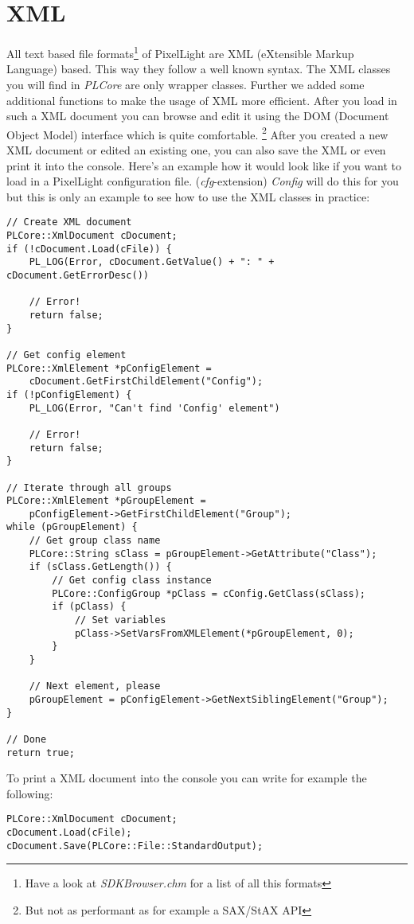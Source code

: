 \section{XML}
All text based file formats\footnote{Have a look at \emph{SDKBrowser.chm} for a list of all this formats} of PixelLight are XML (eXtensible Markup Language) based. This way they follow a well known syntax. The XML classes you will find in \emph{PLCore} are only wrapper classes. Further we added some additional functions to make the usage of XML more efficient. After you load in such a XML document you can browse and edit it using the DOM (Document Object Model) interface which is quite comfortable. \footnote{But not as performant as for example a SAX/StAX API} After you created a new XML document or edited an existing one, you can also save the XML or even print it into the console. Here's an example how it would look like if you want to load in a PixelLight configuration file. (\emph{cfg}-extension) \emph{Config} will do this for you but this is only an example to see how to use the XML classes in practice:

\begin{lstlisting}[caption=XML DOM usage example]
// Create XML document
PLCore::XmlDocument cDocument;
if (!cDocument.Load(cFile)) {
	PL_LOG(Error, cDocument.GetValue() + ": " + cDocument.GetErrorDesc())

	// Error!
	return false;
}

// Get config element
PLCore::XmlElement *pConfigElement =
	cDocument.GetFirstChildElement("Config");
if (!pConfigElement) {
	PL_LOG(Error, "Can't find 'Config' element")

	// Error!
	return false;
}

// Iterate through all groups
PLCore::XmlElement *pGroupElement =
	pConfigElement->GetFirstChildElement("Group");
while (pGroupElement) {
	// Get group class name
	PLCore::String sClass = pGroupElement->GetAttribute("Class");
	if (sClass.GetLength()) {
		// Get config class instance
		PLCore::ConfigGroup *pClass = cConfig.GetClass(sClass);
		if (pClass) {
			// Set variables
			pClass->SetVarsFromXMLElement(*pGroupElement, 0);
		}
	}

	// Next element, please
	pGroupElement = pConfigElement->GetNextSiblingElement("Group");
}

// Done
return true;
\end{lstlisting}

To print a XML document into the console you can write for example the following:

\begin{lstlisting}[caption=Print XML document into the console]
PLCore::XmlDocument cDocument;
cDocument.Load(cFile);
cDocument.Save(PLCore::File::StandardOutput);
\end{lstlisting}
